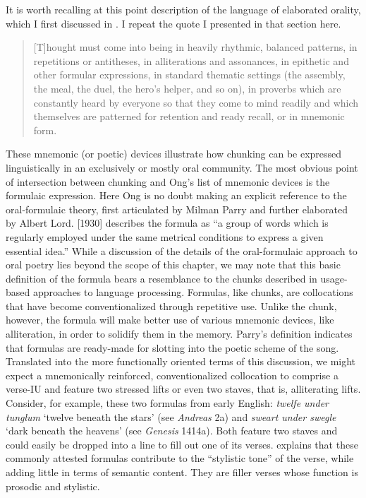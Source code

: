 It is worth recalling at this point  description of the language of elaborated orality, which I first discussed in . I repeat the quote I presented in that section here.

\begin{quote}{}
[T]hought must come into being in heavily rhythmic, balanced patterns, in repetitions or antitheses, in alliterations and assonances, in epithetic and other formular expressions, in standard thematic settings (the assembly, the meal, the duel, the hero’s helper, and so on), in proverbs which are constantly heard by everyone so that they come to mind readily and which themselves are patterned for retention and ready recall, or in mnemonic form.
\end{quote}

\noindent These mnemonic (or poetic) devices illustrate how chunking can be expressed linguistically in an exclusively or mostly oral community. The most obvious point of intersection between chunking and Ong’s list of mnemonic devices is the formulaic expression. Here Ong is no doubt making an explicit reference to the oral-formulaic theory, first articulated by Milman Parry and further elaborated by Albert Lord. \citet[272]{Parry1971} [1930] describes the formula as “a group of words which is regularly employed under the same metrical conditions to express a given essential idea.” While a discussion of the details of the oral-formulaic approach to oral poetry lies beyond the scope of this chapter, we may note that this basic definition of the formula bears a resemblance to the chunks described in usage-based approaches to language processing. Formulas, like chunks, are collocations that have become conventionalized through repetitive use. Unlike the chunk, however, the formula will make better use of various mnemonic devices, like alliteration, in order to solidify them in the memory. Parry’s definition indicates that formulas are ready-made for slotting into the poetic scheme of the song. Translated into the more functionally oriented terms of this discussion, we might expect a mnemonically reinforced, conventionalized collocation to comprise a verse-IU and feature two stressed lifts or even two staves, that is, alliterating lifts. Consider, for example, these two formulas from early English: \textit{twelfe under tunglum} ‘twelve beneath the stars’ (see \textit{Andreas} 2a) and \textit{sweart under swegle} ‘dark beneath the heavens’ (see \textit{Genesis} 1414a). Both feature two staves and could easily be dropped into a line to fill out one of its verses. \citet[297--298]{Riedinger1985} explains that these commonly attested formulas contribute to the “stylistic tone” of the verse, while adding little in terms of semantic content. They are filler verses whose function is prosodic and stylistic.


